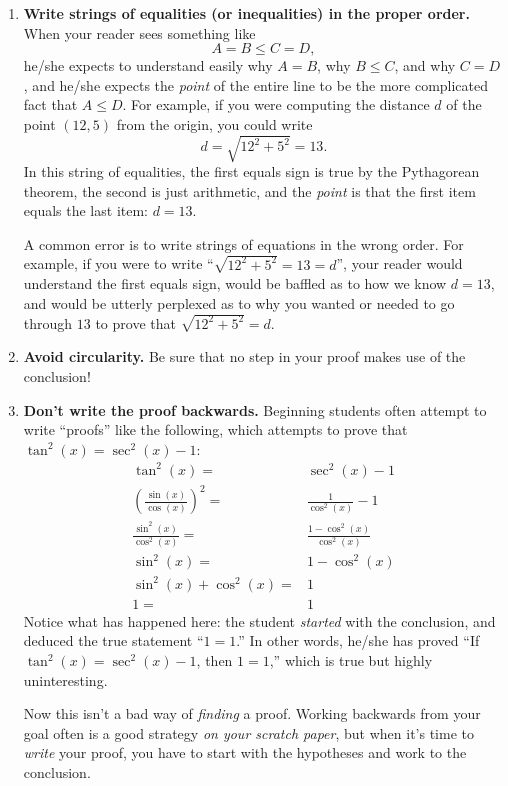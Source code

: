 \begin{enumerate}
\item \textbf{Write strings of equalities (or inequalities) in the proper order.}
        When your reader sees something like
        $$A=B\leq C=D,$$
        he/she expects to understand easily why $A=B$, why $B\leq C$, and why $C=D$,
        and he/she expects the \emph{point} of the entire line to be the more complicated fact that $A\leq D$.
        For example, if you were computing the distance $d$ of the point $(12,5)$ from the origin,
        you could write
        $$d = \sqrt{12^2+5^2} = 13.$$
        In this string of equalities, the first equals sign is true by the Pythagorean theorem, 
        the second is just arithmetic, and the \emph{point} is that the first item equals the last item: $d=13$.
        
        A common error is to write strings of equations in the wrong order.
        For example, if you were to write ``$\sqrt{12^2+5^2}=13=d$'',
        your reader would understand the first equals sign,
        would be baffled as to how we know $d=13$,
        and would be utterly perplexed as to why you wanted or needed to go through $13$ to prove that $\sqrt{12^2+5^2}=d$.

\item \textbf{Avoid circularity.}  Be sure that no step in your proof makes use of the conclusion!
        

\item \textbf{Don't write the proof backwards.}
        Beginning students often attempt to write ``proofs'' like the following, which attempts to prove that $\tan^2(x)  = \sec^2(x) - 1$:
\begin{align*}
 \tan^2(x) =& \sec^2(x) - 1 \\
\left(\frac{\sin(x)}{\cos(x)}\right)^2 =& \frac{1}{\cos^2(x)} - 1 \\
\frac{\sin^2(x)}{\cos^2(x)} =&  \frac{1-\cos^2(x)}{\cos^2(x)} \\
\sin^2(x) =& 1-\cos^2(x) \\
\sin^2(x) + \cos^2(x) =& 1 \\
1 =& 1
\end{align*}        
        Notice what has happened here:  the student \emph{started} with the conclusion,
        and deduced the true statement ``$1=1$.''
        In other words, he/she has proved ``If $\tan^2(x) = \sec^2(x) - 1$, then $1=1$,''
        which is true but highly uninteresting.
        
        Now this isn't a bad way of \emph{finding} a proof.
        Working backwards from your goal often is a good strategy \emph{on your scratch paper},
        but when it's time to \emph{write} your proof,
        you have to start with the hypotheses and work to the conclusion.


\end{enumerate}
